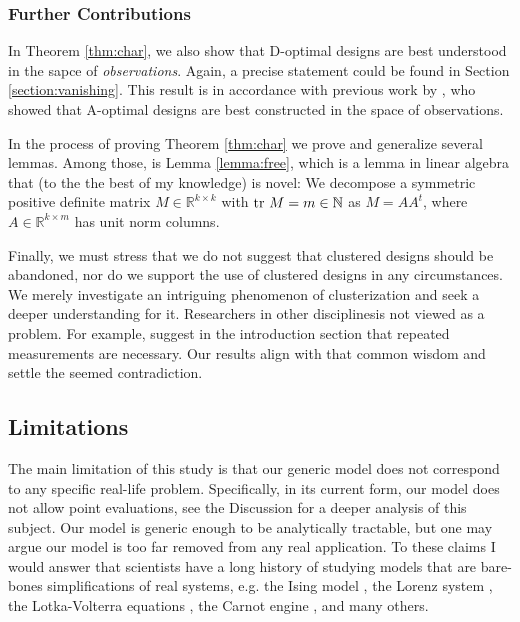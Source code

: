 \subsubsection{Further Contributions}
In Theorem \ref{thm:char}, we also show that D-optimal designs are
best understood in the sapce of \emph{observations}. Again, a precise
statement could be found in Section \ref{section:vanishing}.  This
result is in accordance with previous work by \cite{koval2020}, who
showed that A-optimal designs are best constructed in the space of
observations.

In the process of proving Theorem \ref{thm:char} we prove and
generalize several lemmas. Among those, is Lemma \ref{lemma:free},
which is a lemma in linear algebra that (to the the best of my
knowledge) is novel: We decompose a symmetric positive definite matrix
\(M \in \mathbb{R}^{k \times k}\) with \(\textup{tr}\ M = m \in \mathbb{N}\)
as \(M = AA^t\), where \(A\in \mathbb{R}^{k \times m}\) has unit norm
columns.


Finally, we must stress that we do not suggest that clustered designs
should be abandoned, nor do we support the use of clustered designs in
any circumstances. We merely investigate an intriguing phenomenon of
clusterization and seek a deeper understanding for it. Researchers in
other disciplinesis not viewed as a problem. For example, \cite{lozan}
suggest in the introduction section that repeated measurements are
necessary. Our results align with that common wisdom and settle the
seemed contradiction.


\subsection{Limitations}\label{subsec:limitations}
The main limitation of this study is that our generic model does not
correspond to any specific real-life problem. Specifically, in its
current form, our model does not allow point evaluations, see the
Discussion for a deeper analysis of this subject. Our model is generic
enough to be analytically tractable, but one may argue our model is
too far removed from any real application. To these claims I would
answer that scientists have a long history of studying models that are
bare-bones simplifications of real systems, e.g. the Ising model
\cite{cipra1987}, the Lorenz system \cite{brin}, the Lotka-Volterra
equations \cite{logan2006}, the Carnot engine \cite{kardar2007}, and
many others.
